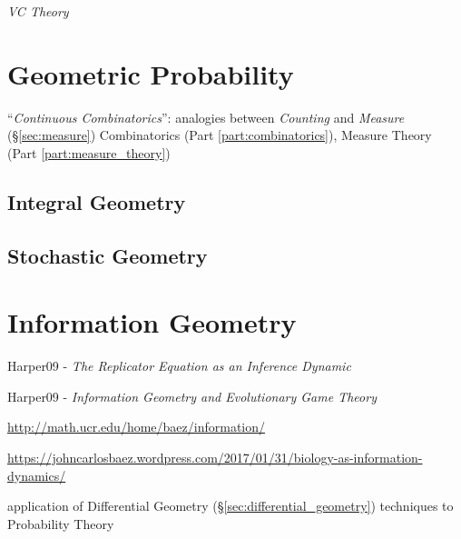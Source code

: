 \emph{VC Theory}



\section{Geometric Probability}\label{sec:geometric_probability}

``\emph{Continuous Combinatorics}'': analogies between \emph{Counting} and
\emph{Measure} (\S\ref{sec:measure}) \fist Combinatorics (Part
\ref{part:combinatorics}), Measure Theory (Part \ref{part:measure_theory})



\subsection{Integral Geometry}\label{sec:integral_geometry}

\subsection{Stochastic Geometry}\label{sec:stochastic_geometry}



\section{Information Geometry}\label{sec:information_geometry}

Harper09 - \emph{The Replicator Equation as an Inference Dynamic}

Harper09 - \emph{Information Geometry and Evolutionary Game Theory}

\url{http://math.ucr.edu/home/baez/information/}

\url{https://johncarlosbaez.wordpress.com/2017/01/31/biology-as-information-dynamics/}

application of Differential Geometry
(\S\ref{sec:differential_geometry}) techniques to Probability Theory



